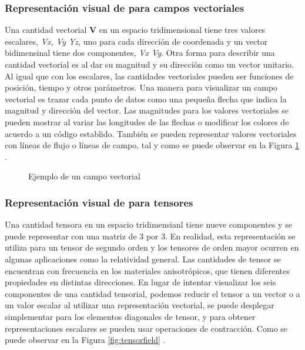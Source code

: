 \documentclass[11pt,letterpaper]{article}     %
\begin{document}
\subsubsection{Representaci\' on visual de para campos vectoriales}
Una cantidad vectorial \textbf{V} en un espacio tridimensional tiene tres valores escalares, \textit{Vx, Vy Yz}, uno para cada direcci\'  on de coordenada y un vector bidimensinal tiene dos componentes, \textit{Vx Vy}. Otra forma para describir una cantidad vectorial es al dar su magnitud y su direcci\'  on como un vector unitario. Al igual  que con los escalares, las cantidades vectoriales pueden ser funciones de posici\'  on, tiempo y otros par\' ametros. Una manera para visualizar un campo vectorial es trazar cada punto de datos como una peque\~ na flecha que indica la magnitud y direcci\'  on del vector.
Las magnitudes para los valores vectoriales se pueden mostrar al variar las longitudes de las flechas o modificar los colores de acuerdo a un c\'  odigo establido. Tambi\'  en se pueden representar valores vectoriales con l\'  ineas de flujo o l\'  ineas de campo, tal y como se puede observar en la Figura \ref{tikz:campovectorial} \cite{Donald Hearn y M. Pauline Baker}.

\begin{figure}
\caption{Ejemplo de un campo vectorial} 
\label{tikz:campovectorial}
\end{figure}



\subsubsection{Representaci\' on visual de para tensores}
Una cantidad tensora en un espacio tridimensianl tiene nueve componentes y se puede representar con una matriz de 3 por 3. En realidad, esta representaci\'  on se utiliza para un tensor de segundo orden y los tensores de orden mayor ocurren en algunas aplicaciones como la relatividad general.
Las cantidades de tensor se encuentran con frecuencia en los materiales anisotr\'  opicos, que tienen diferentes propiedades en distintas direcciones. 
En lugar de intentar visualizar los seis componentes de una cantidad tensorial, podemos reducir el tensor a un vector o a un valor escalar al utilizar una representaci\'  on vectorial, se puede desplegar simplementar para los elementos diagonales de tensor, y para obtener representaciones escalares se pueden usar operaciones de contracci\'  on. Como se puede observar en la Figura \ref{fig:tensorfield} \cite{Avizo Standard} \cite{Donald Hearn y M. Pauline Baker}.
\end{document}
